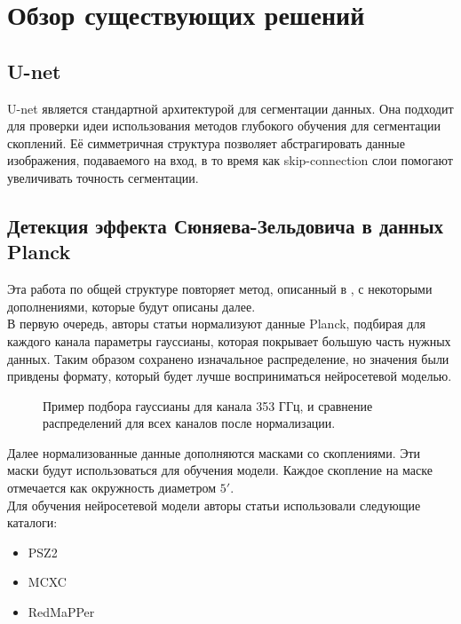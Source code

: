 \chapter{Обзор существующих решений}
\label{cha:ch_1}

\section{U-net}
U-net \cite{Unet} является стандартной архитектурой для сегментации данных. Она подходит для проверки идеи
использования методов глубокого обучения для сегментации скоплений. Её симметричная структура 
позволяет абстрагировать данные изображения, подаваемого на вход, в то время как skip-connection 
слои помогают увеличивать точность сегментации.\\

\section{Детекция эффекта Сюняева-Зельдовича в данных Planck}
Эта работа по общей структуре повторяет метод, описанный в \cite{Bonjean}, с некоторыми 
дополнениями, которые будут описаны далее.\\

В первую очередь, авторы статьи нормализуют данные Planck, подбирая для каждого канала параметры 
гауссианы, которая покрывает большую часть нужных данных. Таким образом сохранено изначальное 
распределение, но значения были привдены формату, который будет лучше восприниматься нейросетевой 
моделью.\\

\begin{figure}
    \caption{Пример подбора гауссианы для канала 353 ГГц, и сравнение распределений для всех 
        каналов после нормализации.}
\end{figure}

Далее нормализованные данные дополняются масками со скоплениями. Эти маски будут использоваться для 
обучения модели. Каждое скопление на маске отмечается как окружность диаметром $5′$.\\

Для обучения нейросетевой модели авторы статьи \cite{Bonjean} использовали следующие каталоги:\\
\begin{itemize}
    \item PSZ2\\
    \item MCXC\\
    \item RedMaPPer\\
\end{itemize}

